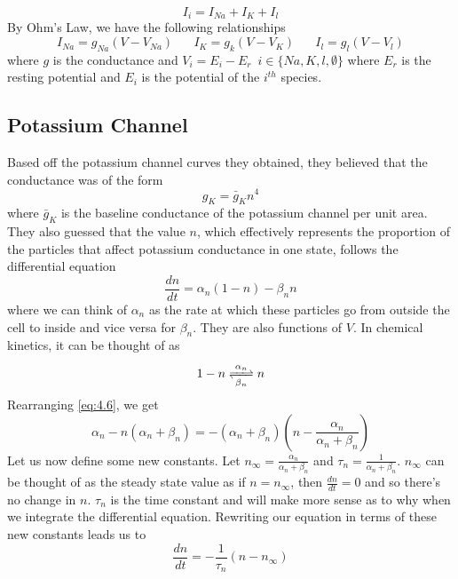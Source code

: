 \documentclass{article}
\newcommand{\od}[2]{\frac{d #1}{d #2}}
\numberwithin{equation}{section}
\begin{document}
\begin{equation}
    I_i = I_{Na}+I_K+I_l
\end{equation}
By Ohm's Law, we have the following relationships
\begin{equation}
    I_{Na} = g_{Na}(V-V_{Na}) \hspace{20pt} I_K=g_k(V-V_K) \hspace{20pt} I_l = g_l(V-V_l)
\end{equation}
where $g$ is the conductance and $V_i = E_i - E_r \,\,\, i\in \{Na,K,l,\emptyset\}$ where $E_r$ is the resting potential and $E_i$ is the potential of the $i^{th}$ species.
\subsection{Potassium Channel}
Based off the potassium channel curves they obtained, they believed that the conductance was of the form 
\begin{equation}
    g_K = \bar{g}_Kn^4
\end{equation}
where $\bar{g}_K$ is the baseline conductance of the potassium channel per unit area. They also guessed that the value $n$, which effectively represents the proportion of the particles that affect potassium conductance in one state, follows the differential equation 
\begin{equation}
    \od{n}{t}=\alpha_n(1-n)-\beta_n n \label{eq:4.6}
\end{equation}
where we can think of $\alpha_n$ as the rate at which these particles go from outside the cell to inside and vice versa for $\beta_n$. They are also functions of $V$. In chemical kinetics, it can be thought of as 
\begin{equation}
    1-n \ce{<=>[\alpha_n][\beta_n]}n
\end{equation}
Rearranging \eqref{eq:4.6}, we get 
\begin{equation*}
    \alpha_n - n(\alpha_n+\beta_n) = -(\alpha_n+\beta_n)\left(n-\frac{\alpha_n}{\alpha_n+\beta_n} \right)
\end{equation*}
Let us now define some new constants. Let $n_\infty = \frac{\alpha_n}{\alpha_n+\beta_n}$ and $\tau_n=\frac{1}{\alpha_n+\beta_n}$. $n_\infty$ can be thought of as the steady state value as if $n=n_\infty$, then $\od{n}{t} = 0$ and so there's no change in $n$. $\tau_n$ is the time constant and will make more sense as to why when we integrate the differential equation. Rewriting our equation in terms of these new constants leads us to 
\begin{equation}
    \od{n}{t} =-\frac{1}{\tau_n}(n-n_\infty) 
\end{equation}
\end{document}
